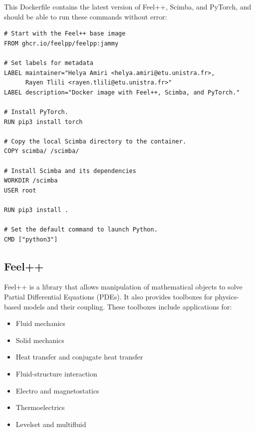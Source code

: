 \documentclass[12pt]{article}
\begin{document}
This Dockerfile contains the latest version of Feel++, Scimba, and PyTorch, and should be able to run these commands without error:
\\
\begin{lstlisting}[language=docker,caption={Dockerfile for Feel++, Scimba, and PyTorch},frame=single, backgroundcolor=\color{gray!10}, basicstyle=\footnotesize,rulecolor=\color{blue}, framexleftmargin=3pt, commentstyle=\color{mygreen}, keywordstyle=\color{blue}]
# Start with the Feel++ base image
FROM ghcr.io/feelpp/feelpp:jammy

# Set labels for metadata
LABEL maintainer="Helya Amiri <helya.amiri@etu.unistra.fr>,
      Rayen Tlili <rayen.tlili@etu.unistra.fr>"
LABEL description="Docker image with Feel++, Scimba, and PyTorch."

# Install PyTorch.
RUN pip3 install torch

# Copy the local Scimba directory to the container.
COPY scimba/ /scimba/

# Install Scimba and its dependencies
WORKDIR /scimba
USER root

RUN pip3 install .

# Set the default command to launch Python.
CMD ["python3"]
\end{lstlisting}


\newpage


\subsection{Feel++}

Feel++ is a library that allows manipulation of mathematical objects to solve Partial Differential Equations (PDEs). It also provides toolboxes for physics-based models and their coupling. These toolboxes include applications for:

\begin{itemize}
    \item Fluid mechanics
    \item Solid mechanics
    \item Heat transfer and conjugate heat transfer
    \item Fluid-structure interaction
    \item Electro and magnetostatics
    \item Thermoelectrics
    \item Levelset and multifluid
\end{itemize}
\end{document}
